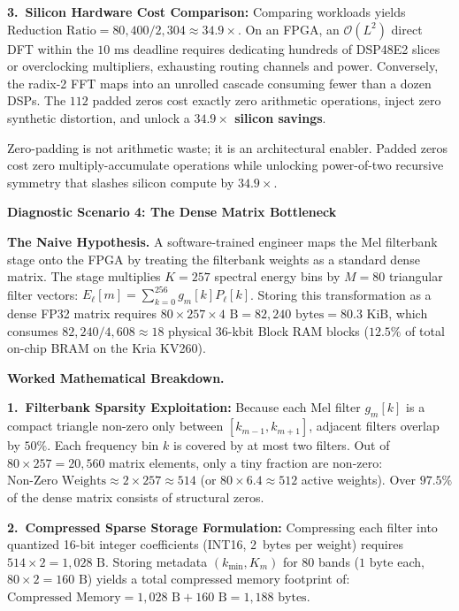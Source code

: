 \documentclass[11pt,a4paper]{article}
\newcommand{\diagsec}[1]{\vspace{1.6pt}\textbf{\large #1}\vspace{0.5pt}\par}
\begin{document}
\textbf{3.~Silicon Hardware Cost Comparison:} Comparing workloads yields $\text{Reduction Ratio} = 80{,}400 / 2{,}304 \approx 34.9\times$. On an FPGA, an $\mathcal{O}(L^2)$ direct DFT within the $10\text{ ms}$ deadline requires dedicating hundreds of DSP48E2 slices or overclocking multipliers, exhausting routing channels and power. Conversely, the radix-2 FFT maps into an unrolled cascade consuming fewer than a dozen DSPs. The $112$ padded zeros cost exactly zero arithmetic operations, inject zero synthetic distortion, and unlock a \textbf{$34.9\times$ silicon savings}.

\begin{physicalinsight}
Zero-padding is not arithmetic waste; it is an architectural enabler. Padded zeros cost zero multiply-accumulate operations while unlocking power-of-two recursive symmetry that slashes silicon compute by $34.9\times$.
\end{physicalinsight}

\clearpage
\diagsec{Diagnostic Scenario 4: The Dense Matrix Bottleneck}

\textbf{The Naive Hypothesis.} A software-trained engineer maps the Mel filterbank stage onto the FPGA by treating the filterbank weights as a standard dense matrix. The stage multiplies $K = 257$ spectral energy bins by $M = 80$ triangular filter vectors: $E_\ell[m] = \sum_{k=0}^{256} g_m[k] P_\ell[k]$. Storing this transformation as a dense FP32 matrix requires $80 \times 257 \times 4\text{ B} = 82{,}240\text{ bytes} = 80.3\text{ KiB}$, which consumes $82{,}240 / 4{,}608 \approx 18$ physical 36-kbit Block RAM blocks ($12.5\%$ of total on-chip BRAM on the Kria KV260).

\textbf{Worked Mathematical Breakdown.}

\textbf{1.~Filterbank Sparsity Exploitation:} Because each Mel filter $g_m[k]$ is a compact triangle non-zero only between $[k_{m-1}, k_{m+1}]$, adjacent filters overlap by $50\%$. Each frequency bin $k$ is covered by at most two filters. Out of $80 \times 257 = 20{,}560$ matrix elements, only a tiny fraction are non-zero:
$\text{Non-Zero Weights} \approx 2 \times 257 \approx 514$ (or $80 \times 6.4 \approx 512$ active weights). Over $97.5\%$ of the dense matrix consists of structural zeros.

\textbf{2.~Compressed Sparse Storage Formulation:} Compressing each filter into quantized 16-bit integer coefficients (INT16, 2~bytes per weight) requires $514 \times 2 = 1{,}028\text{ B}$. Storing metadata $(k_{\text{min}}, K_m)$ for 80 bands ($1\text{ byte}$ each, $80 \times 2 = 160\text{ B}$) yields a total compressed memory footprint of:
$\text{Compressed Memory} = 1{,}028\text{ B} + 160\text{ B} = 1{,}188\text{ bytes}$.
\end{document}
